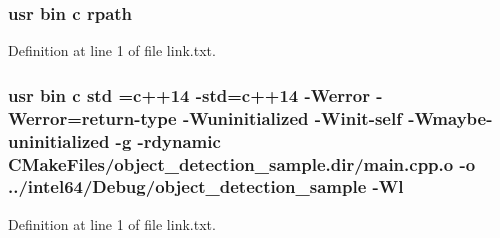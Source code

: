 \subsubsection[{\texorpdfstring{rpath}{rpath}}]{\setlength{\rightskip}{0pt plus 5cm}usr bin {\bf c} rpath}\hypertarget{object__detection__sample_2CMakeFiles_2object__detection__sample_8dir_2link_8txt_ab9d7fd7120fafa2118a4e08c1df697c7}{}\label{object__detection__sample_2CMakeFiles_2object__detection__sample_8dir_2link_8txt_ab9d7fd7120fafa2118a4e08c1df697c7}


Definition at line 1 of file link.\+txt.

\subsubsection[{\texorpdfstring{std}{std}}]{\setlength{\rightskip}{0pt plus 5cm}usr bin {\bf c} std ={\bf c}++14 -\/std={\bf c}++14 -\/Werror -\/Werror=return-\/type -\/Wuninitialized -\/Winit-\/self -\/Wmaybe-\/uninitialized -\/g -\/rdynamic C\+Make\+Files/object\+\_\+detection\+\_\+sample.\+dir/main.\+cpp.\+o -\/o ../intel64/Debug/object\+\_\+detection\+\_\+sample -\/{\bf Wl}}\hypertarget{object__detection__sample_2CMakeFiles_2object__detection__sample_8dir_2link_8txt_a1ccfea5f558575a112db71eeb271fabf}{}\label{object__detection__sample_2CMakeFiles_2object__detection__sample_8dir_2link_8txt_a1ccfea5f558575a112db71eeb271fabf}


Definition at line 1 of file link.\+txt.

